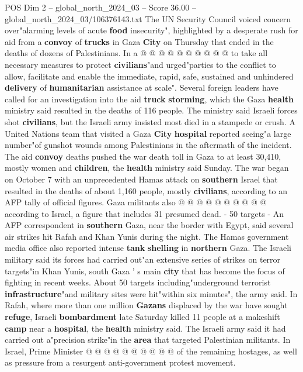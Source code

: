 \begin{textsample}{POS Dim 2 – global\_north\_2024\_03 – Score 36.00 – global\_north\_2024\_03/106376143.txt}
The UN Security Council voiced concern over"alarming levels of acute \textbf{food} insecurity", highlighted by a desperate rush for aid from a \textbf{convoy} of \textbf{trucks} in Gaza \textbf{City} on Thursday that ended in the deaths of dozens of Palestinians.
In a @ @ @ @ @ @ @ @ @ @ to take all necessary measures to protect \textbf{civilians}"and urged"parties to the conflict to allow, facilitate and enable the immediate, rapid, safe, sustained and unhindered \textbf{delivery} of \textbf{humanitarian} assistance at scale".
Several foreign leaders have called for an investigation into the aid \textbf{truck} \textbf{storming}, which the Gaza \textbf{health} ministry said resulted in the deaths of 116 people.
The ministry said Israeli forces shot \textbf{civilians}, but the Israeli army insisted most died in a stampede or crush.
A United Nations team that visited a Gaza \textbf{City} \textbf{hospital} reported seeing"a large number"of gunshot wounds among Palestinians in the aftermath of the incident.
The aid \textbf{convoy} deaths pushed the war death toll in Gaza to at least 30,410, mostly women and \textbf{children}, the \textbf{health} ministry said Sunday.
The war began on October 7 with an unprecedented Hamas attack on \textbf{southern} Israel that resulted in the deaths of about 1,160 people, mostly \textbf{civilians}, according to an AFP tally of official figures.
Gaza militants also @ @ @ @ @ @ @ @ @ @ according to Israel, a figure that includes 31 presumed dead. - 50 targets - An AFP correspondent in \textbf{southern} Gaza, near the border with Egypt, said several air strikes hit Rafah and Khan Yunis during the night.
The Hamas government media office also reported intense \textbf{tank} \textbf{shelling} in \textbf{northern} Gaza.
The Israeli military said its forces had carried out"an extensive series of strikes on terror targets"in Khan Yunis, south Gaza ' s main \textbf{city} that has become the focus of fighting in recent weeks.
About 50 targets including"underground terrorist \textbf{infrastructure}"and military sites were hit"within six minutes", the army said.
In Rafah, where more than one million \textbf{Gazans} displaced by the war have sought \textbf{refuge}, Israeli \textbf{bombardment} late Saturday killed 11 people at a makeshift \textbf{camp} near a \textbf{hospital}, the \textbf{health} ministry said.
The Israeli army said it had carried out a"precision strike"in the \textbf{area} that targeted Palestinian militants.
In Israel, Prime Minister @ @ @ @ @ @ @ @ @ @ of the remaining hostages, as well as pressure from a resurgent anti-government protest movement.

\end{textsample}
